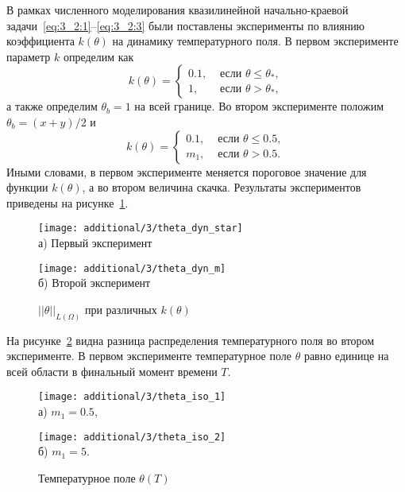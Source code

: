 В рамках численного моделирования квазилинейной начально-краевой задачи~\eqref{eq:3_2:1}--\eqref{eq:3_2:3}
были поставлены эксперименты по влиянию коэффициента $k(\theta)$ на динамику температурного поля.
В первом эксперименте параметр $k$ определим как
\[
    k(\theta)=
    \begin{cases}
        0.1, & \text { если } \theta \leq \theta_{*}, \\
        1, & \text { если } \theta>\theta_{*},
    \end{cases}
\]
а также определим $\theta_b = 1$ на всей границе.
Во втором эксперименте положим $\theta_b = (x + y) /2$ и
\[
    k(\theta)=
    \begin{cases}
        0.1, & \text { если } \theta \leq 0.5, \\
        m_1, & \text { если } \theta > 0.5.
    \end{cases}
\]
Иными словами, в первом эксперименте меняется пороговое значение
для функции $k(\theta)$, а во втором величина скачка.
Результаты экспериментов приведены на рисунке~\ref{fig:4_3:theta_dyn_diff}.
\begin{figure}[h!t]
    \begin{minipage}[b][][b]{0.49\linewidth}
        \centering
        \texttt{[image: additional/3/theta\_dyn\_star]} \\ а) Первый эксперимент
    \end{minipage}
    \hfill
    \begin{minipage}[b][][b]{0.49\linewidth}
        \centering
        \texttt{[image: additional/3/theta\_dyn\_m]} \\ б) Второй эксперимент
    \end{minipage}
    \caption{$||\theta||_{L(\Omega)}$ при различных $k(\theta)$}
    \label{fig:4_3:theta_dyn_diff}
\end{figure}
На рисунке~\ref{fig:4_3:theta_iso_2exp} видна разница распределения температурного поля
во втором эксперименте.
В первом эксперименте температурное поле $\theta$ равно единице на всей области в
финальный момент времени $T$.
\begin{figure}[h!t]
    \begin{minipage}[b][][b]{0.49\linewidth}
        \centering
        \texttt{[image: additional/3/theta\_iso\_1]} \\ а) $m_1 = 0.5$,
    \end{minipage}
    \hfill
    \begin{minipage}[b][][b]{0.49\linewidth}
        \centering
        \texttt{[image: additional/3/theta\_iso\_2]} \\ б) $m_1 = 5$.
    \end{minipage}
    \caption{Температурное поле $\theta (T)$}
    \label{fig:4_3:theta_iso_2exp}
\end{figure}

